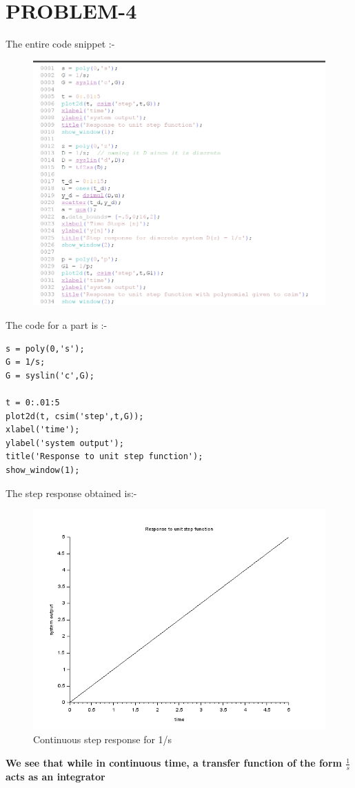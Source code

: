\documentclass[12pt]{article}
\begin{document}
\section{PROBLEM-4}
The entire code snippet :-
    \begin{figure}[H]
        \centering
        \includegraphics[scale=0.8]{q4_code.png}
    \end{figure}
The code for a part is :-
\begin{verbatim}
s = poly(0,'s');
G = 1/s;
G = syslin('c',G);

t = 0:.01:5
plot2d(t, csim('step',t,G));
xlabel('time');
ylabel('system output');
title('Response to unit step function');
show_window(1);
    \end{verbatim}
 The step response obtained is:-
    \begin{figure}[H]
        \centering
        \includegraphics[scale=0.8]{q4_a.png}
        \caption{Continuous step response for 1/s}
        \label{fig:my_label}
    \end{figure}
\textbf{We see that while in continuous time, a transfer function of the form $\frac{1}{s}$ acts as an integrator}
\end{document}
